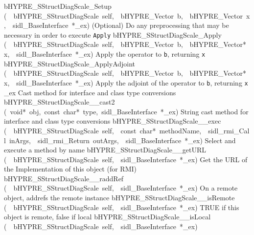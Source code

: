 \documentclass{article}
\begin{document}
\begin{cxxentry}
\begin{cxxentry}
\begin{cxxnames}
        {bHYPRE\_SStructDiagScale\_Setup}
        {(\ \ bHYPRE\_SStructDiagScale\ self,\ \ bHYPRE\_Vector\ b,\ \ bHYPRE\_Vector\ x,\ \ sidl\_BaseInterface\ *\_ex)}
        {
(Optional) Do any preprocessing that may be necessary in
order to execute {\tt Apply}}
        {}
\label{cxx.8.1.26}
        {bHYPRE\_SStructDiagScale\_Apply}
        {(\ \ bHYPRE\_SStructDiagScale\ self,\ \ bHYPRE\_Vector\ b,\ \ bHYPRE\_Vector*\ x,\ \ sidl\_BaseInterface\ *\_ex)}
        {
Apply the operator to {\tt b}, returning {\tt x}}
        {}
\label{cxx.8.1.27}
        {bHYPRE\_SStructDiagScale\_ApplyAdjoint}
        {(\ \ bHYPRE\_SStructDiagScale\ self,\ \ bHYPRE\_Vector\ b,\ \ bHYPRE\_Vector*\ x,\ \ sidl\_BaseInterface\ *\_ex)}
        {
Apply the adjoint of the operator to {\tt b}, returning {\tt x}}
        {}
\label{cxx.8.1.28}
        {\_ex}
        {}
        {
Cast method for interface and class type conversions}
        {}
\label{cxx.8.1.29}
        {bHYPRE\_SStructDiagScale\_\_cast2}
        {(\ void*\ obj,\ const\ char*\ type,\ sidl\_BaseInterface\ *\_ex)}
        {
String cast method for interface and class type conversions}
        {}
\label{cxx.8.1.30}
        {bHYPRE\_SStructDiagScale\_\_exec}
        {(\ \ bHYPRE\_SStructDiagScale\ self,\ \ const\ char*\ methodName,\ \ sidl\_rmi\_Call\ inArgs,\ \ sidl\_rmi\_Return\ outArgs,\ \ sidl\_BaseInterface\ *\_ex)}
        {
Select and execute a method by name}
        {}
\label{cxx.8.1.31}
        {bHYPRE\_SStructDiagScale\_\_getURL}
        {(\ \ bHYPRE\_SStructDiagScale\ self,\ \ sidl\_BaseInterface\ *\_ex)}
        {
Get the URL of the Implementation of this object (for RMI)}
        {}
\label{cxx.8.1.32}
        {bHYPRE\_SStructDiagScale\_\_raddRef}
        {(\ \ bHYPRE\_SStructDiagScale\ self,\ \ sidl\_BaseInterface\ *\_ex)}
        {
On a remote object, addrefs the remote instance}
        {}
\label{cxx.8.1.33}
        {bHYPRE\_SStructDiagScale\_\_isRemote}
        {(\ \ bHYPRE\_SStructDiagScale\ self,\ \ sidl\_BaseInterface\ *\_ex)}
        {
TRUE if this object is remote, false if local}
        {}
\label{cxx.8.1.34}
        {bHYPRE\_SStructDiagScale\_\_isLocal}
        {(\ \ bHYPRE\_SStructDiagScale\ self,\ \ sidl\_BaseInterface\ *\_ex)}

\end{cxxnames}
\end{cxxentry}
\end{cxxentry}
\end{document}
